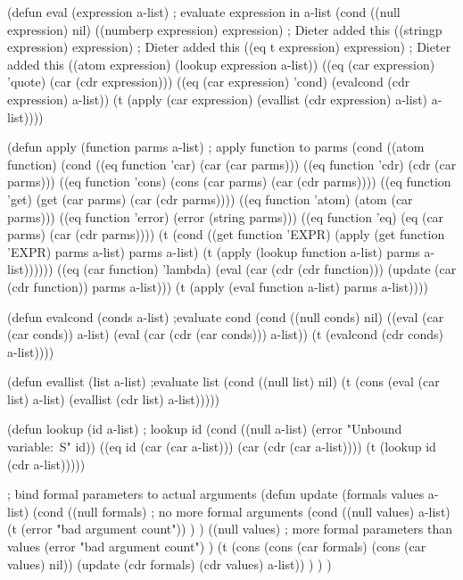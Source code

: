 \begin{LISP}
  (defun eval (expression a-list) ; evaluate expression in a-list
  (cond
  ((null expression) nil)
  ((numberp expression) expression) ; Dieter added this
  ((stringp expression) expression) ; Dieter added this
  ((eq t expression) expression) ; Dieter added this
  ((atom expression) (lookup expression a-list))
  ((eq (car expression) 'quote) (car (cdr expression)))
  ((eq (car expression) 'cond) (evalcond (cdr expression) a-list))
  (t (apply (car expression) (evallist (cdr expression) a-list) a-list))))
\end{LISP}
\begin{LISP}
(defun apply (function parms a-list) ; apply function to parms
  (cond
    ((atom function) (cond
  ((eq function 'car) (car (car parms)))
  ((eq function 'cdr) (cdr (car parms)))
  ((eq function 'cons) (cons (car parms) (car (cdr parms))))
  ((eq function 'get) (get (car parms) (car (cdr parms))))
  ((eq function 'atom) (atom (car parms)))
  ((eq function 'error) (error (string parms)))
  ((eq function 'eq) (eq (car parms) (car (cdr parms))))
  (t (cond
  ((get function 'EXPR)
  (apply (get function 'EXPR) parms a-list) parms a-list)
  (t (apply (lookup function a-list) parms a-list))))))
  ((eq (car function) 'lambda)
  (eval (car (cdr (cdr function)))
  (update (car (cdr function)) parms a-list)))
  (t (apply (eval function a-list) parms a-list))))
\end{LISP}
\begin{LISP}
  (defun evalcond (conds a-list) ;evaluate cond
  (cond
  ((null conds) nil)
  ((eval (car (car conds)) a-list)
  (eval (car (cdr (car conds))) a-list))
  (t (evalcond (cdr conds) a-list))))
\end{LISP}

\begin{LISP}
  (defun evallist (list a-list) ;evaluate list
  (cond
    ((null list) nil)
    (t (cons (eval (car list) a-list)
    (evallist (cdr list) a-list)))))
\end{LISP}

\begin{LISP}
  (defun lookup (id a-list) ; lookup id
  (cond
  ((null a-list) (error "Unbound variable:~S" id))
  ((eq id (car (car a-list))) (car (cdr (car a-list))))
  (t (lookup id (cdr a-list)))))
\end{LISP}

\begin{LISP}
; bind formal parameters to actual arguments
(defun update (formals values a-list) 
  (cond 
    ((null formals) ; no more formal arguments
      (cond
        ((null values) a-list)
        (t (error "bad argument count"))
      )
    )
    ((null values) ; more formal parameters than values 
      (error "bad argument count")
    )
    (t 
      (cons (cons (car formals)
        (cons (car values) nil))
        (update (cdr formals) (cdr values) a-list))
    )
  )
)
\end{LISP}

